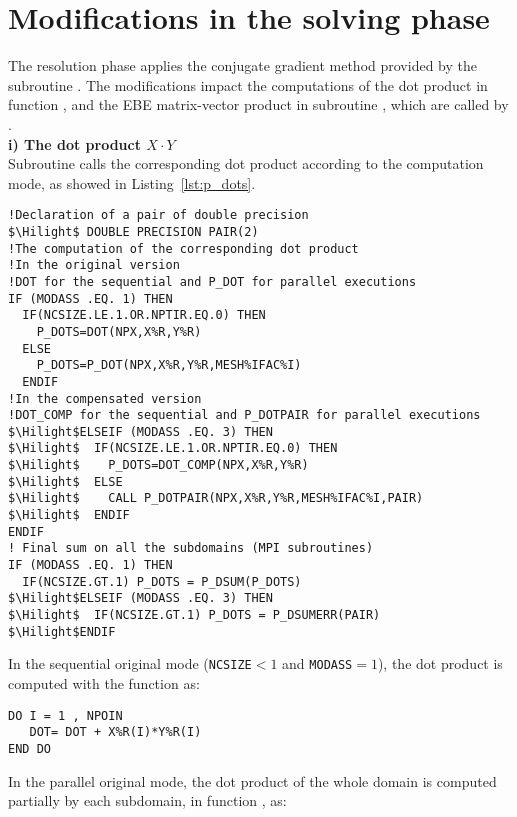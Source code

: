 \section{Modifications in the solving phase}
\label{sec:imple_solve}
%
The resolution phase applies the conjugate gradient method
provided by the subroutine .
The modifications impact the computations of the dot product
in function , and the EBE
matrix-vector product in subroutine ,
which are called by .\\
%
\textbf{i) The dot product $X \cdot Y$}\\
Subroutine  calls the corresponding dot product according to the computation mode,
as showed in Listing~\ref{lst:p_dots}.
%
\begin{lstlisting}[language=TelFortran,
caption={The calls of the corresponding dot product in \telfile{P\_DOTS}},
label={lst:p_dots},escapechar=\$]
!Declaration of a pair of double precision
$\Hilight$ DOUBLE PRECISION PAIR(2)
!The computation of the corresponding dot product
!In the original version
!DOT for the sequential and P_DOT for parallel executions
IF (MODASS .EQ. 1) THEN
  IF(NCSIZE.LE.1.OR.NPTIR.EQ.0) THEN
    P_DOTS=DOT(NPX,X%R,Y%R)
  ELSE
    P_DOTS=P_DOT(NPX,X%R,Y%R,MESH%IFAC%I)
  ENDIF
!In the compensated version
!DOT_COMP for the sequential and P_DOTPAIR for parallel executions
$\Hilight$ELSEIF (MODASS .EQ. 3) THEN
$\Hilight$  IF(NCSIZE.LE.1.OR.NPTIR.EQ.0) THEN
$\Hilight$    P_DOTS=DOT_COMP(NPX,X%R,Y%R)
$\Hilight$  ELSE
$\Hilight$    CALL P_DOTPAIR(NPX,X%R,Y%R,MESH%IFAC%I,PAIR)
$\Hilight$  ENDIF
ENDIF
! Final sum on all the subdomains (MPI subroutines)
IF (MODASS .EQ. 1) THEN
  IF(NCSIZE.GT.1) P_DOTS = P_DSUM(P_DOTS)
$\Hilight$ELSEIF (MODASS .EQ. 3) THEN
$\Hilight$  IF(NCSIZE.GT.1) P_DOTS = P_DSUMERR(PAIR)
$\Hilight$ENDIF
\end{lstlisting}
%
In the sequential original mode (\texttt{NCSIZE}$<1$ and \texttt{MODASS}$=1$),
the dot product is computed with the function  as:
\begin{lstlisting}[language=TelFortran,numbers=none,frame=none,escapechar=\$]
DO I = 1 , NPOIN
   DOT= DOT + X%R(I)*Y%R(I)
END DO
\end{lstlisting}
%
In the parallel original mode, the dot product of the whole domain
is computed partially by each subdomain, in function , as:

